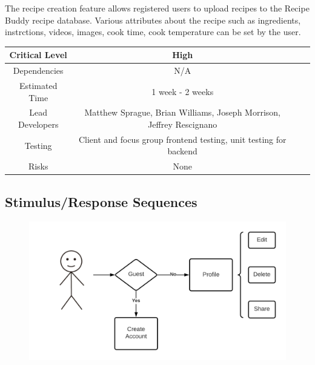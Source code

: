 \documentclass{scrreprt}
\begin{document}
The recipe creation feature allows registered users to upload recipes to the \gls{Recipe Buddy} recipe database. Various attributes about the recipe such as ingredients, instrctions, videos, images, cook time, cook temperature can be set by the user.

\begin{center}
    \begin{tabular}{| c | c | c | c |}
        \hline
        Critical Level  & High                                                                 \\
        \hline
        Dependencies    & N/A                                                                  \\
        \hline
        Estimated Time  & 1 week - 2 weeks                                                     \\
        \hline
        Lead Developers & Matthew Sprague, Brian Williams, Joseph Morrison, Jeffrey Rescignano \\
        \hline
        Testing         & Client and focus group frontend testing, unit testing for backend    \\
        \hline
        Risks           & None                                                                 \\
        \hline
    \end{tabular}
\end{center}

\subsection{Stimulus/Response Sequences}

\begin{figure}[H]\centering
    \includegraphics[width=\columnwidth]{FlowCharts/Recipe-Creation.png}
\end{figure}
\end{document}
